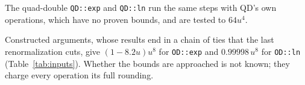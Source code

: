 The quad-double \texttt{QD::exp} and \texttt{QD::ln} run the same steps with QD's own operations, which have no proven
bounds, and are tested to $64u^4$.

\begin{remark}
Constructed arguments, whose results end in a
chain of ties that the last renormalization cuts, give $(1 - 8.2u)u^8$ for \texttt{OD::exp} and $0.99998\,u^8$ for
\texttt{OD::ln} (Table~\ref{tab:inputs}). Whether the bounds are approached is not known; they charge every operation
its full rounding.
\end{remark}
